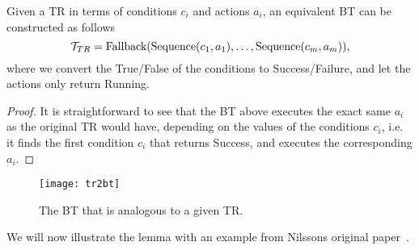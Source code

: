 \begin{lemma}
\label{btsvsothers:lem:tr2bt}
 Given a TR in terms of conditions $c_i$ and actions $a_i$, an equivalent BT can be constructed as follows
\begin{equation}
 \mathcal{T}_{TR}=\mbox{Fallback}(\mbox{Sequence}(c_1,a_1), \ldots, \mbox{Sequence}(c_m,a_m)),
\end{equation}
where we convert the True/False of the conditions to Success/Failure, and let the actions only return Running.
\end{lemma}
\begin{proof}
 It is straightforward to see that the BT above executes the exact same $a_i$ as the original TR would have, depending on the values of the conditions $c_i$, i.e. it finds the first condition $c_i$ that returns Success, and executes the corresponding $a_i$.
\end{proof}


\begin{figure}[htbp]
\begin{center}
\texttt{[image: tr2bt]}
\caption{The BT that is analogous to a given TR.}
\label{btsvsothers:tr2bt}
\end{center}
\end{figure}

We will now illustrate the lemma with an example from Nilssons original paper~\cite{nilsson1994teleo}.

